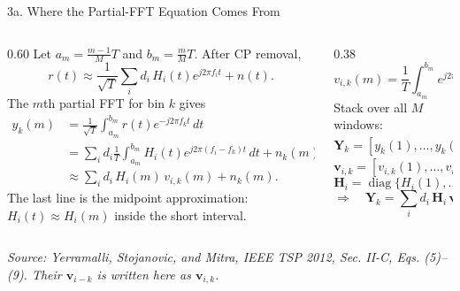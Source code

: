 \documentclass[aspectratio=169,10pt]{beamer}
\newcommand{\vY}{\bm{Y}}
\newcommand{\vn}{\bm{n}}
\newcommand{\vv}{\bm{v}}
\newcommand{\vH}{\bm{H}}
\begin{document}
\begin{frame}{3a. Where the Partial-FFT Equation Comes From}

  \footnotesize
  \setlength{\abovedisplayskip}{0.35em}
  \setlength{\belowdisplayskip}{0.35em}
  \newcommand{\am}{a_m}
  \newcommand{\bmint}{b_m}
  \begin{columns}[T,onlytextwidth]
    \begin{column}{0.60\textwidth}
      Let $\am=\frac{m-1}{M}T$ and $\bmint=\frac{m}{M}T$.  After CP removal,
      \[
        r(t) \approx \frac{1}{\sqrt{T}}
        \sum_i d_i\,H_i(t)e^{j2\pi f_i t}+n(t).
      \]
      The $m$th partial FFT for bin $k$ gives
      \[
      \begin{aligned}
        y_k(m)
        &=\frac{1}{\sqrt{T}}\int_{\am}^{\bmint}
          r(t)e^{-j2\pi f_k t}\,dt\\
        &=\sum_i d_i\frac{1}{T}\int_{\am}^{\bmint}
          H_i(t)e^{j2\pi(f_i-f_k)t}\,dt+n_k(m)\\
        &\approx
        \sum_i d_i\,H_i(m)\,v_{i,k}(m)+n_k(m).
      \end{aligned}
      \]
      The last line is the midpoint approximation:
      $H_i(t)\approx H_i(m)$ inside the short interval.
    \end{column}

    \begin{column}{0.38\textwidth}
      \[
        v_{i,k}(m)=
        \frac{1}{T}\int_{\am}^{\bmint}
        e^{j2\pi(f_i-f_k)t}\,dt .
      \]
      Stack over all $M$ windows:
      \[
        \vY_k=[y_k(1),\ldots,y_k(M)]^{\mathsf T},
      \]
      \[
        \vv_{i,k}=[v_{i,k}(1),\ldots,v_{i,k}(M)]^{\mathsf T},
      \]
      \[
        \vH_i=\operatorname{diag}\{H_i(1),\ldots,H_i(M)\}.
      \]
      \vspace{0.2em}
      \[
        \Rightarrow\quad
        \boxed{
        \vY_k=\sum_i d_i\,\vH_i\,\vv_{i,k}+\vn_k
        }
      \]
    \end{column}
  \end{columns}

  \vspace{0.2em}
  \begin{center}
    {\itshape\footnotesize Source: Yerramalli, Stojanovic, and Mitra,
    IEEE TSP 2012, Sec. II-C, Eqs. (5)--(9). Their $\vv_{i-k}$ is written here as $\vv_{i,k}$.}
  \end{center}

\end{frame}
\end{document}
